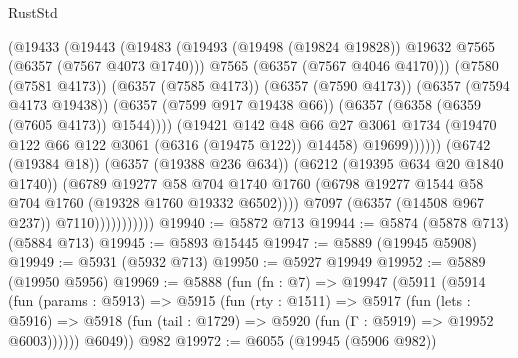 \begin{lexlean}{RustStd}
\begin{coremodule}
                                      (@19433
                                        (@19443
                                          (@19483
                                            (@19493
                                              (@19498 (@19824 @19828))
                                              @19632
                                              @7565
                                              (@6357 (@7567 @4073 @1740)))
                                            @7565
                                            (@6357 (@7567 @4046 @4170)))
                                          (@7580 (@7581 @4173))
                                          (@6357 (@7585 @4173))
                                          (@6357 (@7590 @4173))
                                          (@6357 (@7594 @4173 @19438))
                                          (@6357 (@7599 @917 @19438 @66))
                                          (@6357 (@6358 (@6359 (@7605 @4173)) @1544))))
                                      (@19421
                                        @142
                                        @48
                                        @66
                                        @27
                                        @3061
                                        @1734
                                        (@19470 @122 @66 @122 @3061 (@6316 (@19475 @122)) @14458)
                                        @19699))))))
                            (@6742 (@19384 @18))
                            (@6357 (@19388 @236 @634))
                            (@6212 (@19395 @634 @20 @1840 @1740))
                            (@6789
                              @19277
                              @58
                              @704
                              @1740
                              @1760
                              (@6798 @19277 @1544 @58 @704 @1760 (@19328 @1760 @19332 @6502))))
                          @7097
                          (@6357 (@14508 @967 @237))
                          @7110)))))))))))
@19940 := @5872 @713
@19944 := @5874 (@5878 @713) (@5884 @713)
@19945 := @5893 @15445
@19947 := @5889 (@19945 @5908)
@19949 := @5931 (@5932 @713)
@19950 := @5927 @19949
@19952 := @5889 (@19950 @5956)
@19969 := @5888
    (fun (fn : @7) =>
    @19947
      (@5911
        (@5914
          (fun (params : @5913) =>
          @5915
            (fun (rty : @1511) =>
            @5917
              (fun (lets : @5916) =>
              @5918 (fun (tail : @1729) => @5920 (fun (Γ : @5919) => @19952 @6003))))))
        @6049))
    @982
@19972 := @6055 (@19945 (@5906 @982))

\end{coremodule}
\end{lexlean}
